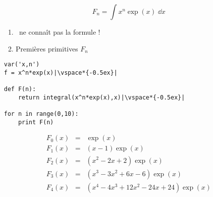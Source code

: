\begin{frame}[fragile]
\vspace*{-1ex}

$$F_n = \int x^n \exp(x) \; \dd x$$

\vspace*{-1ex}
\pause

\begin{enumerate}
  \item \Sage\ ne connaît pas la formule !
  
\pause  
  
  \item Premières primitives $F_n$
\end{enumerate}

\vspace*{-1ex}
\pause

{\small
\begin{algo}
\begin{lstlisting}
var('x,n')
f = x^n*exp(x)|\vspace*{-0.5ex}|
   
def F(n):
    return integral(x^n*exp(x),x)|\vspace*{-0.5ex}|
    
for n in range(0,10):
    print F(n)
\end{lstlisting}
\end{algo}

\pause
\vspace*{-2ex}

  $$\begin{array}{rcl}
    F_0(x) &=& \exp(x) \\
    F_1(x) &=& (x - 1)\exp(x) \\
    F_2(x) &=& (x^2 - 2x + 2)\exp(x) \\
    F_3(x) &=& (x^3 - 3x^2 + 6x - 6)\exp(x) \\
    F_4(x) &=& (x^4 - 4x^3 + 12x^2 - 24x + 24)\exp(x) \\
  \end{array}$$ 
}  
\end{frame}



